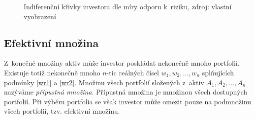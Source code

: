 \documentclass[12pt,a4paper]{report}
\begin{document}
\begin{figure}[htb]
\centering
{} 
\caption{Indiferenční křivky investora dle míry odporu k~riziku, zdroj: vlastní vyobrazení \label{obr_ICs}}
\end{figure}

\subsection{Efektivní množina}
Z~konečné množiny aktiv může investor poskládat nekonečně mnoho portfolií. Existuje totiž nekonečně mnoho $n$-tic reálných čísel $w_1,w_2,\dots,w_n$ splňujících podmínky \eqref{wr1} a \eqref{wr2}. Množinu všech portfolií složených z~aktiv $A_1,A_2,\dots,A_n$ nazýváme \emph{přípustná množina}. Přípustná množina je množinou všech dostupných portfolií. Při výběru portfolia se však investor může omezit pouze na podmnožinu všech portfolií, tzv. efektivní množinu.
\end{document}
